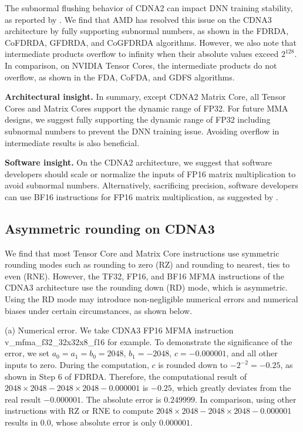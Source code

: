 The subnormal flushing behavior of CDNA2 can impact DNN training stability, as reported by \cite{pytorch_developers_pytorch_2025}. We find that AMD has resolved this issue on the CDNA3 architecture by fully supporting subnormal numbers, as shown in the FDRDA, CoFDRDA, GFDRDA, and CoGFDRDA algorithms. However, we also note that intermediate products overflow to infinity when their absolute values exceed $2^{128}$. In comparison, on NVIDIA Tensor Cores, the intermediate products do not overflow, as shown in the FDA, CoFDA, and GDFS algorithms.

\textbf{Architectural insight.} In summary, except CDNA2 Matrix Core, all Tensor Cores and Matrix Cores support the dynamic range of FP32. For future MMA designs, we suggest fully supporting the dynamic range of FP32 including subnormal numbers to prevent the DNN training issue. Avoiding overflow in intermediate results is also beneficial.

\textbf{Software insight.} On the CDNA2 architecture, we suggest that software developers should scale or normalize the inputs of FP16 matrix multiplication to avoid subnormal numbers. Alternatively, sacrificing precision, software developers can use BF16 instructions for FP16 matrix multiplication, as suggested by \cite{pytorch_developers_pytorch_2025}.

\subsection{Asymmetric rounding on CDNA3}

We find that most Tensor Core and Matrix Core instructions use symmetric rounding modes such as rounding to zero (RZ) and rounding to nearest, ties to even (RNE). However, the TF32, FP16, and BF16 MFMA instructions of the CDNA3 architecture use the rounding down (RD) mode, which is asymmetric. Using the RD mode may introduce non-negligible numerical errors and numerical biases under certain circumstances, as shown below.

(a) Numerical error. We take CDNA3 FP16 MFMA instruction v\_mfma\_f32\_32x32x8\_f16 for example. To demonstrate the significance of the error, we set $a_0=a_1=b_0=2048$, $b_1=-2048$, $c=-0.000001$, and all other inputs to zero. During the computation, $c$ is rounded down to $-2^{-2}=-0.25$, as shown in Step 6 of FDRDA. Therefore, the computational result of $2048\times2048-2048\times2048-0.000001$ is $-0.25$, which greatly deviates from the real result $-0.000001$. The absolute error is $0.249999$. In comparison, using other instructions with RZ or RNE to compute $2048\times2048-2048\times2048-0.000001$ results in $0.0$, whose absolute error is only $0.000001$.


